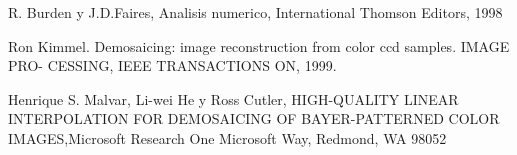 \begin{thebibliography}{9}

  R. Burden y J.D.Faires, Analisis numerico, International Thomson Editors, 1998

Ron Kimmel. Demosaicing: image reconstruction from color ccd samples. IMAGE PRO-
CESSING, IEEE TRANSACTIONS ON, 1999.

Henrique S. Malvar, Li-wei He y Ross Cutler, HIGH-QUALITY LINEAR INTERPOLATION FOR DEMOSAICING OF BAYER-PATTERNED COLOR IMAGES,Microsoft Research One Microsoft Way, Redmond, WA 98052

\end{thebibliography}
